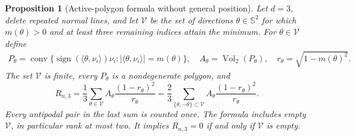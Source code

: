 \documentclass[10pt,reqno]{amsart}
\newtheorem{proposition}[theorem]{Proposition}
\theoremstyle{definition}
\theoremstyle{remark}
\newcommand{\Sphere}{\mathbb S}
\newcommand{\conv}{\operatorname{conv}}
\newcommand{\Vol}{\operatorname{Vol}}
\newcommand{\ip}[2]{\langle #1,#2\rangle}
\begin{document}
\begin{proposition}[Active-polygon formula without general position]\label{prop:polygon}
Let $d=3$, delete repeated normal lines, and let $\mathcal V$ be the set of directions $\theta\in\Sphere^2$ for which $m(\theta)>0$ and at least three remaining indices attain the minimum. For $\theta\in\mathcal V$ define
\begin{gather*}
P_\theta=\conv\{\operatorname{sign}(\ip{\theta}{\nu_i})\nu_i:
|\ip{\theta}{\nu_i}|=m(\theta)\},\quad
A_\theta=\Vol_2(P_\theta),\quad r_\theta=\sqrt{1-m(\theta)^2}.
\end{gather*}
The set $\mathcal V$ is finite, every $P_\theta$ is a nondegenerate polygon, and
\begin{equation}\label{eq:polygon-R}
\boxed{R_{n,3}=\frac13\sum_{\theta\in\mathcal V}A_\theta\frac{(1-r_\theta)^2}{r_\theta}
=\frac23\sum_{\{\theta,-\theta\}\subset\mathcal V}A_\theta\frac{(1-r_\theta)^2}{r_\theta}.}
\end{equation}
Every antipodal pair in the last sum is counted once. The formula includes empty $\mathcal V$, in particular rank at most two. It implies $R_{n,3}=0$ if and only if $\mathcal V$ is empty.
\end{proposition}
\end{document}
